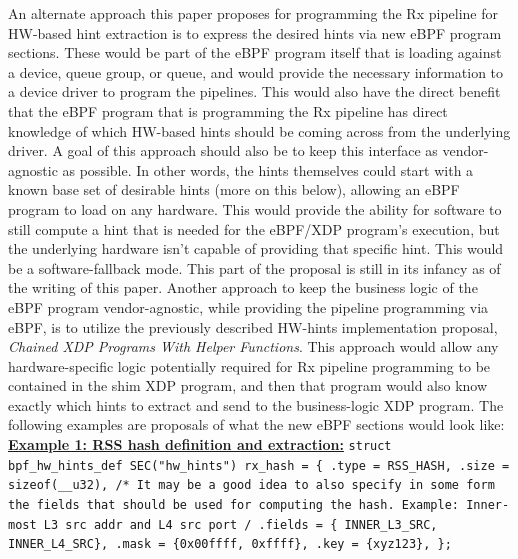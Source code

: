 \documentclass[letterpaper]{article}
\begin{document}
An alternate approach this paper proposes for programming the Rx pipeline for HW-based hint extraction is to express the desired hints via new eBPF program sections. These would be part of the eBPF program itself that is loading against a device, queue group, or queue, and would provide the necessary information to a device driver to program the pipelines. This would also have the direct benefit that the eBPF program that is programming the Rx pipeline has direct knowledge of which HW-based hints should be coming across from the underlying driver.
\newline
\indent A goal of this approach should also be to keep this interface as vendor-agnostic as possible. In other words, the hints themselves could start with a known base set of desirable hints (more on this below), allowing an eBPF program to load on any hardware. This would provide the ability for software to still compute a hint that is needed for the eBPF/XDP program's execution, but the underlying hardware isn't capable of providing that specific hint. This would be a software-fallback mode. This part of the proposal is still in its infancy as of the writing of this paper.
\newline
\indent Another approach to keep the business logic of the eBPF program vendor-agnostic, while providing the pipeline programming via eBPF, is to utilize the previously described HW-hints implementation proposal, \textit{Chained XDP Programs With Helper Functions}. This approach would allow any hardware-specific logic potentially required for Rx pipeline programming to be contained in the shim XDP program, and then that program would also know exactly which hints to extract and send to the business-logic XDP program.
\newline
\newline
The following examples are proposals of what the new eBPF sections would look like:
\newline
\newline
\textbf{\underline{Example 1: RSS hash definition and extraction:}}
\newline
\newline
{\scriptsize \texttt{struct bpf\_hw\_hints\_def SEC("hw\_hints") rx\_hash = \{
\newline
\indent .type = RSS\_HASH,
\newline
\indent .size = sizeof(\_\_u32),
\newline
\indent /* It may be a good idea to also specify in some form
\newline
\indent \space * the fields that should be used for computing
\newline
\indent \space * the hash.
\newline
\indent \space * Example: Inner-most L3 src addr and L4 src port
\newline
\indent \space */
\newline
\indent .fields = \{ INNER\_L3\_SRC, INNER\_L4\_SRC\},
\newline
\indent .mask = \{0x00ffff, 0xffff\},
\newline
\indent .key = \{xyz123\},
\newline
\};
}}
\end{document}
